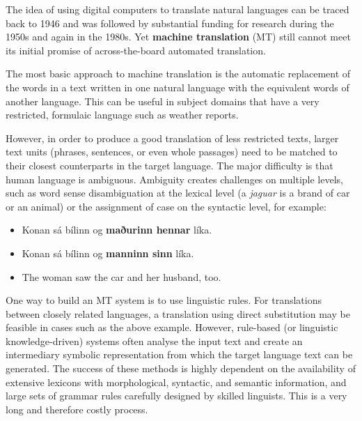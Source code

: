 \begin{multicols}{2}
The idea of using digital computers to translate natural languages can be traced back to 1946 and was followed by substantial funding for research during the 1950s and again in the 1980s. Yet \textbf{machine translation} (MT) still cannot meet its initial promise of across-the-board automated translation.
 

The most basic approach to machine translation is the automatic replacement of the words in a text written in one natural language with the equivalent words of another language. This can be useful in subject domains that have a very restricted, formulaic language such as weather reports.

However, in order to produce a good translation of less restricted texts, larger text units (phrases, sentences, or even whole passages) need to be matched to their closest counterparts in the target language. The major difficulty is that human language is ambiguous. Ambiguity creates challenges on multiple levels, such as word sense disambiguation at the lexical level (a \textit{jaguar} is a brand of car or an animal) or the assignment of case on the syntactic level, for example:

\begin{itemize}
\item Konan sá bílinn og \textbf{maðurinn hennar} líka.
\item Konan sá bílinn og \textbf{manninn sinn} líka.
\item The woman saw the car and her husband, too.
\end{itemize}

One way to build an MT system is to use linguistic rules. For translations between closely related languages, a translation using direct substitution may be feasible in cases such as the above example. However, rule-based (or linguistic knowledge-driven) systems often analyse the input text and create an intermediary symbolic representation from which the target language text can be generated. The success of these methods is highly dependent on the availability of extensive lexicons with morphological, syntactic, and semantic information, and large sets of grammar rules carefully designed by skilled linguists. This is a very long and therefore costly process.


\end{multicols}
